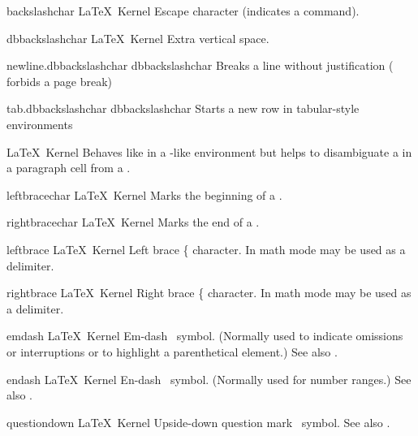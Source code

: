 \renewcommand{\summarypreamble}{%
Commands or environments defined in the \LaTeX\ kernel are always
available.%
}

 {backslashchar}
 {\backslashsym}
 {}
 {\LaTeX\ Kernel}
 {Escape character (indicates a command).}
 {}

 {dbbackslashchar}
 {\dbbackslashsym}
 {}
 {\LaTeX\ Kernel}
 {\nopostdesc}
 {%
   \BeginArgList
     Extra vertical space.
   \EndArgList
 }

 {newline.dbbackslashchar}
 {dbbackslashchar}
 {\dbbackslashsym}
 {Breaks a line without justification (\protect{}
   forbids a page break)}

 {tab.dbbackslashchar}
 {dbbackslashchar}
 {\dbbackslashsym}
 {Starts a new row in tabular-style environments}

%
 {}%
 {\LaTeX\ Kernel}%
 {Behaves like  in a
   -like environment but helps to disambiguate a
     in a paragraph
    cell from a .}%
 {}

 {leftbracechar}
 {\leftbracesym}
 {}
 {\LaTeX\ Kernel}
 {Marks the beginning of a .}
 {}

 {rightbracechar}
 {\rightbracesym}
 {}
 {\LaTeX\ Kernel}
 {Marks the end of a .}
 {}

 {leftbrace}
 {\leftbracesym}
 {}
 {\LaTeX\ Kernel}
 {Left brace \{ character. In math mode may be used as a delimiter.}
 {}

 {rightbrace}
 {\rightbracesym}
 {}
 {\LaTeX\ Kernel}
 {Right brace \{ character. In math mode may be used as a delimiter.}
 {}

 {emdash}%
 {\emDashcs}%
 {}%
 {\LaTeX\ Kernel}%
 {Em-dash \textemdash\ symbol. (Normally used to
  indicate omissions or interruptions or to highlight a parenthetical element.)
  See also .}%
 {}

 {endash}%
 {\enDashcs}%
 {}%
 {\LaTeX\ Kernel}%
 {En-dash \textendash\ symbol.  (Normally used for number ranges.)
  See also .}%
 {}

 {questiondown}%
 {\questiondowncs}%
 {}%
 {\LaTeX\ Kernel}%
 {Upside-down question mark \textquestiondown\ symbol. See also .}%
 {}

